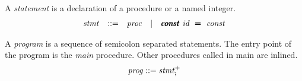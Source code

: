 \documentclass{article}
\begin{document}
A \emph{statement} is a declaration of a procedure or a named integer.
\[
\begin{array}{rclcl}
\stmt &  ::= & \proc %
      & \mid & \pmb\iconst\ \id\ \pmb\eqop\ \const
\end{array}
\]

A \emph{program} is a sequence of semicolon separated statements.
The entry point of the program is the \emph{main} procedure.
Other procedures called in main are inlined.
\[
\mathit{prog} ::= \mathit{stmt}_{\pmb;}^+
\]
\end{document}
